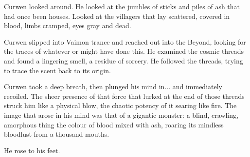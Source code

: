 Curwen looked around. 
He looked at the jumbles of sticks and piles of ash that had once been houses. 
Looked at the villagers that lay scattered, covered in blood, limbs cramped, eyes gray and dead. 

Curwen slipped into Vaimon trance and reached out into the Beyond, looking for the traces of whatever \qliphoth{} or \daemons{} might have done this. 
He examined the cosmic threads and found a lingering smell, a residue of sorcery. 
He followed the threads, trying to trace the scent back to its origin. 


Curwen took a deep breath, then plunged his mind in... and immediately recoiled. 
The sheer presence of that force that lurked at the end of those threads struck him like a physical blow, the chaotic potency of it searing like fire. 
The image that arose in his mind was that of a gigantic monster: 
a blind, crawling, amorphous thing the colour of blood mixed with ash, roaring its mindless bloodlust from a thousand mouths. 


He rose to his feet. 









